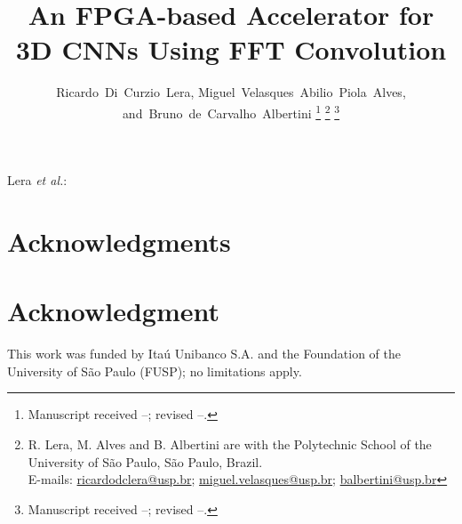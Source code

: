 \documentclass[
  10pt,
  journal,
  compsoc,
]{IEEEtran}
\begin{document}

\title{An FPGA-based Accelerator for 3D CNNs Using FFT Convolution}

\author{
  Ricardo~Di~Curzio~Lera,
  Miguel~Velasques~Abilio~Piola~Alves,
  and~Bruno~de~Carvalho~Albertini%
  \ifCLASSOPTIONcompsoc\else%
    \thanks{Manuscript received --; revised --.}%
  \fi%
  \thanks{%
    R. Lera, M. Alves and B. Albertini are with the Polytechnic School of the University of São Paulo, São Paulo, Brazil.\protect\\
    E-mails: \href{mailto:ricardodclera@usp.br}{ricardodclera@usp.br}; \href{mailto:me@somewhere.com}{miguel.velasques@usp.br}; \href{mailto:me@somewhere.com}{balbertini@usp.br}%
  }%
  \ifCLASSOPTIONcompsoc%
    \thanks{Manuscript received --; revised --.}%
  \fi%
}

\makeatletter
  {Lera \MakeLowercase{\textit{et al.}}: \@title}
\makeatother


\newif\ifjournal\journaltrue


\maketitle
\IEEEdisplaynontitleabstractindextext



\ifCLASSOPTIONcompsoc
\section*{Acknowledgments}
  \else
\section*{Acknowledgment}
\fi
  This work was funded by Itaú Unibanco S.A. and the Foundation of the University of São Paulo (FUSP); no limitations apply.

\ifCLASSOPTIONcaptionsoff
  \newpage
\fi




\end{document}
